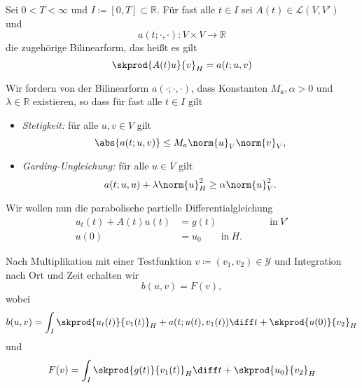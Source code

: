 Sei $0 < T < \infty$ und $I \coloneqq [0, T] \subset \mathbb{R}$.
Für fast alle $t \in I$ sei $A(t) \in \mathcal L(V, V')$ und
\begin{equation}
    a(t; \cdot, \cdot) \colon V \times V \to \mathbb{R}
\end{equation}
die zugehörige Bilinearform, das heißt es gilt
\begin{equation}
    \skprod{A(t)u}{v}_{H} = a(t; u, v)
\end{equation}

Wir fordern von der Bilinearform $a(\cdot; \cdot, \cdot)$, dass Konstanten $M_a,
\alpha > 0$ und $\lambda \in \mathbb{R}$ existieren, so dass für fast alle $t
\in I$ gilt
\begin{itemize}
    \item \emph{Stetigkeit:} für alle $u, v \in V$ gilt
        \begin{equation}
            \label{eq:stetigkeit}
            \abs{a(t; u, v)} \leq M_a \norm{u}_V \norm{v}_V,
        \end{equation}
    \item \emph{Garding-Ungleichung:} für alle $u \in V$ gilt
        \begin{equation}
            \label{eq:garding-inequality}
            a(t; u, u) + \lambda \norm{u}^2_H \geq \alpha \norm{u}^2_V.
        \end{equation}
\end{itemize}

Wir wollen nun die parabolische partielle Differentialgleichung
\begin{equation}
    \label{eq:}
    \begin{aligned}
        u_t(t) + A(t) u(t) &= g(t) &\qquad \text{in}~V'\\
        u(0) &= u_0 \qquad \text{in}~H.
    \end{aligned}
\end{equation}

Nach Multiplikation mit einer Testfunktion $v \coloneqq (v_1, v_2) \in \mathcal{Y}$ und Integration nach Ort und Zeit erhalten wir
\begin{equation}
    \label{eq:bilinearform}
    b(u, v) = F(v),
\end{equation}
wobei
\begin{equation}
    b(u,v) = \int_{I} \skprod{u_{t}(t)}{v_{1}(t)}_{H} + a(t; u(t), v_{1}(t)) \diff t + \skprod{u(0)}{v_{2}}_{H}
\end{equation}
und
\begin{equation}
    F(v) = \int_{I} \skprod{g(t)}{v_{1}(t)}_{H} \diff t + \skprod{u_{0}}{v_{2}}_{H}
\end{equation}

